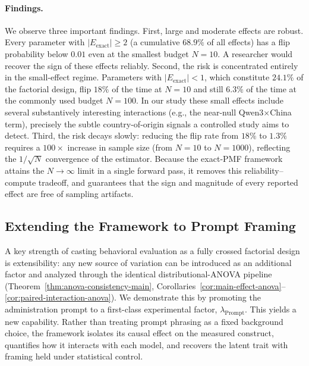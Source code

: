\paragraph{Findings.}
We observe three important findings. 
First, large and moderate effects are robust. 
Every parameter with $|E_{\text{exact}}|\ge 2$ (a cumulative $68.9\%$ of all effects)
has a flip probability below $0.01$ even at the smallest budget $N{=}10$. 
A researcher would recover the sign of these effects reliably. 
Second, the risk is concentrated entirely in the small-effect regime. 
Parameters with $|E_{\text{exact}}|<1$, 
which constitute $24.1\%$ of the factorial design, 
flip $18\%$ of the time at $N{=}10$ 
and still $6.3\%$ of the time at the commonly used budget $N{=}100$. 
In our study these small effects include several substantively interesting interactions 
(e.g., the near-null Qwen3$\times$China term), 
precisely the subtle country-of-origin signals a controlled study aims to detect. 
Third, the risk decays slowly: reducing the flip rate from $18\%$ to $1.3\%$ requires a $100\times$ increase in
sample size (from $N{=}10$ to $N{=}1000$), 
reflecting the $1/\sqrt{N}$ convergence of the estimator. 
Because the exact-PMF framework attains the $N\to\infty$ limit in
a single forward pass, it removes this reliability--compute tradeoff,
and guarantees that the sign and magnitude of every reported effect are free of
sampling artifacts.












\subsection{Extending the Framework to Prompt Framing}
\label{app:prompt-framing}

A key strength of casting behavioral evaluation as a fully crossed factorial
design is extensibility: any new source of variation can be introduced as an
additional factor and analyzed through the identical distributional-ANOVA
pipeline
(Theorem~\ref{thm:anova-consistency-main},
Corollaries~\ref{cor:main-effect-anova}--\ref{cor:paired-interaction-anova}).
We demonstrate this by promoting the administration prompt to a first-class
experimental factor, $\lambda_{\text{Prompt}}$. 
This yields a new capability. 
Rather than treating prompt phrasing as a fixed background choice, 
the framework isolates its causal effect on the measured construct, quantifies how it
interacts with each model, and recovers the latent trait with framing held under
statistical control.

